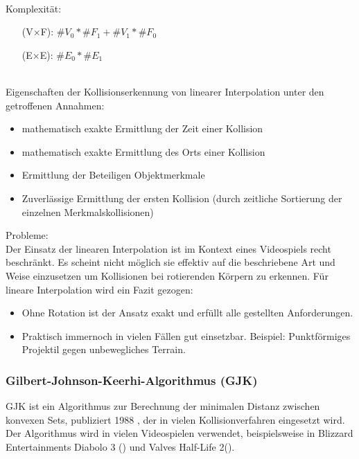 \ \\
		Komplexität:
\begin{itemize}
			\item [(V$\times$F):] $\#V_0*\#F_1 + \#V_1*\#F_0$
			\item [(E$\times$E):] $\#E_0*\#E_1$
		\end{itemize}
\ \\
		Eigenschaften der Kollisionserkennung von linearer Interpolation unter den getroffenen Annahmen:
		\begin{itemize}
			\item mathematisch exakte Ermittlung der Zeit einer Kollision
			\item mathematisch exakte Ermittlung des Orts einer Kollision
			\item Ermittlung der Beteiligen Objektmerkmale
			\item Zuverlässige Ermittlung der ersten Kollision (durch zeitliche Sortierung der einzelnen Merkmalskollisionen)
		\end{itemize}
Probleme:\\
Der Einsatz der linearen Interpolation ist im Kontext eines Videospiels recht beschränkt.
Es scheint nicht möglich sie effektiv auf die beschriebene Art und Weise einzusetzen um Kollisionen bei rotierenden Körpern zu erkennen.
Für lineare Interpolation wird ein Fazit gezogen:
\begin{itemize}
	\item Ohne Rotation ist der Ansatz exakt und erfüllt alle gestellten Anforderungen.
	\item Praktisch immernoch in vielen Fällen gut einsetzbar. Beispiel: Punktförmiges Projektil gegen unbewegliches Terrain.
\end{itemize}

\subsubsection{Gilbert-Johnson-Keerhi-Algorithmus (GJK)}
GJK ist ein Algorithmus zur Berechnung der minimalen Distanz zwischen konvexen Sets, publiziert 1988 \cite{gjk}, der in vielen Kollisionverfahren eingesetzt wird.\\
		Der Algorithmus wird in vielen Videospielen verwendet, beispielsweise in Blizzard Entertainments Diabolo 3 (\cite{gdc-physics}) und Valves Half-Life 2(\cite{gjk-blog}).\\
		
